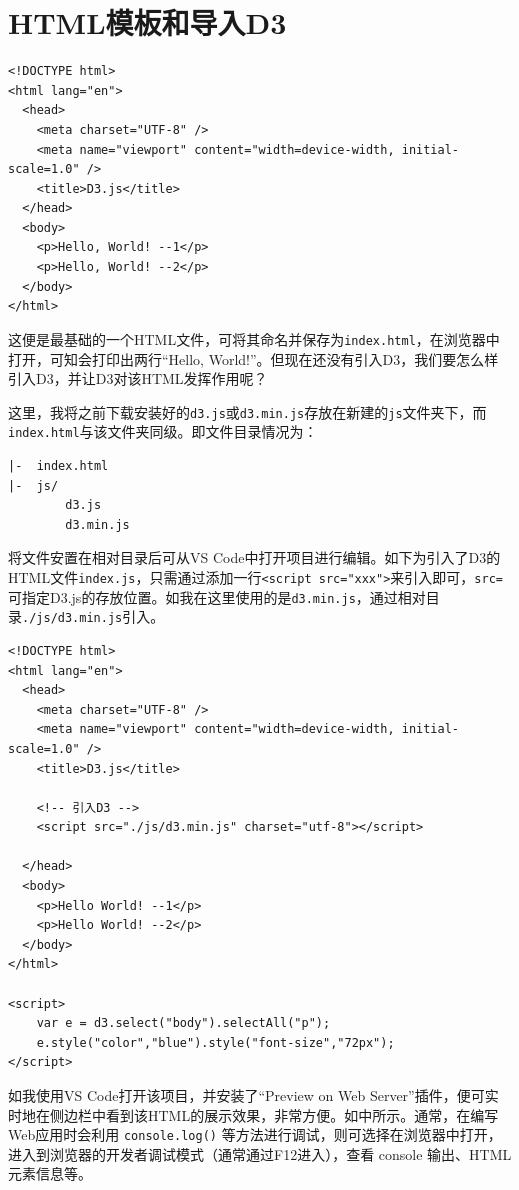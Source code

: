 \section{HTML模板和导入D3}

\begin{verbatim}
<!DOCTYPE html>
<html lang="en">
  <head>
    <meta charset="UTF-8" />
    <meta name="viewport" content="width=device-width, initial-scale=1.0" />
    <title>D3.js</title>
  </head>
  <body>
    <p>Hello, World! --1</p>
    <p>Hello, World! --2</p>
  </body>
</html>
\end{verbatim}

这便是最基础的一个HTML文件，可将其命名并保存为\verb|index.html|，在浏览器中打开，可知会打印出两行``Hello, World!''。但现在还没有引入D3，我们要怎么样引入D3，并让D3对该HTML发挥作用呢？

这里，我将之前下载安装好的\verb|d3.js|或\verb|d3.min.js|存放在新建的\verb|js|文件夹下，而\verb|index.html|与该文件夹同级。即文件目录情况为：

\begin{verbatim}
|-  index.html
|-  js/
        d3.js
        d3.min.js
\end{verbatim}

将文件安置在相对目录后可从VS Code中打开项目进行编辑。如下为引入了D3的HTML文件\verb|index.js|，只需通过添加一行\verb|<script src="xxx">|来引入即可，\verb|src=|可指定D3.js的存放位置。如我在这里使用的是\verb|d3.min.js|，通过相对目录\verb|./js/d3.min.js|引入。

\begin{verbatim}
<!DOCTYPE html>
<html lang="en">
  <head>
    <meta charset="UTF-8" />
    <meta name="viewport" content="width=device-width, initial-scale=1.0" />
    <title>D3.js</title>
    
    <!-- 引入D3 -->
    <script src="./js/d3.min.js" charset="utf-8"></script>

  </head>
  <body>
    <p>Hello World! --1</p>
    <p>Hello World! --2</p>
  </body>
</html>

<script>
    var e = d3.select("body").selectAll("p");
    e.style("color","blue").style("font-size","72px");
</script>
\end{verbatim}

如我使用VS Code打开该项目，并安装了``Preview on Web Server''插件，便可实时地在侧边栏中看到该HTML的展示效果，非常方便。如中所示。通常，在编写Web应用时会利用 \verb|console.log()| 等方法进行调试，则可选择在浏览器中打开，进入到浏览器的开发者调试模式（通常通过F12进入），查看 console 输出、HTML元素信息等。


